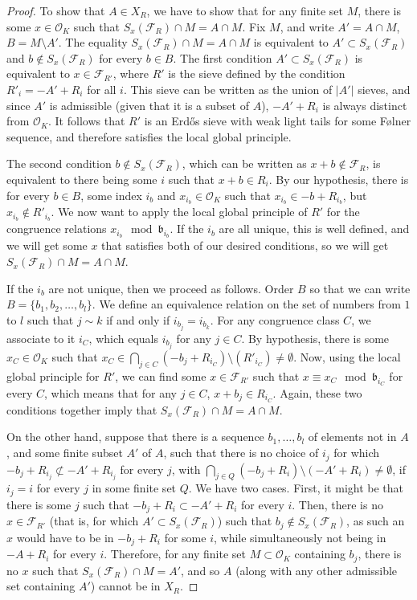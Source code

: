 \documentclass[a4paper,11pt,reqno]{amsart}
\theoremstyle{plain}
\theoremstyle{remark}
\newcommand{\co}{\mathcal{O}}
\newcommand{\fr}{\mathcal{F}_R}
\newcommand{\frp}{\mathcal{F}_{R'}}
\newcommand{\gb}{\mathfrak{b}}
\begin{document}
			\begin{proof}
				To show that $A \in X_R$, we have to show that for any finite set $M$, there is some $x \in \co_K$ such that $S_x(\fr) \cap M = A \cap M$. Fix $M$, and write $A' = A \cap M$, $B = M \setminus A'$. The equality $S_x(\fr) \cap M = A \cap M$ is equivalent to $A' \subset S_x(\fr)$ and $b \not \in S_x(\fr)$ for every $b \in B$. The first condition $A' \subset S_x(\fr)$ is equivalent to $x \in \frp$, where $R'$ is the sieve defined by the condition $R'_i = -A' + R_i$ for all $i$. This sieve can be written as the union of $|A'|$ sieves, and since $A'$ is admissible (given that it is a subset of $A$), $-A' + R_i$ is always distinct from $\co_K$. It follows that $R'$ is an Erdős sieve with weak light tails for some Følner sequence, and therefore satisfies the local global principle. 
				
				The second condition $b \not \in S_x(\fr)$, which can be written as $x+b \not \in \fr$, is equivalent to there being some $i$ such that $x + b  \in R_i$. By our hypothesis, there is for every $b \in B$, some index $i_b$ and $x_{i_b} \in \co_K$ such that $x_{i_b} \in -b + R_{i_b}$, but $x_{i_b} \not \in R'_{i_b}$. We now want to apply the local global principle of $R'$ for the congruence relations $x_{i_b} \mod \gb_{i_b}$. 
				If the $i_b$ are all unique, this is well defined, and we will  get some $x$ that satisfies both of our desired conditions, so we will get $S_x(\fr) \cap M = A \cap M$. 
				
				If the $i_b$ are not unique, then we proceed as follows. Order $B$ so that we can write $B = \{b_1,b_2,\dots,b_l\}$. We define an equivalence relation on the set of numbers from $1$ to $l$ such that $j \sim k$ if and only if $i_{b_j} = i_{b_k}$. For any congruence class $C$, we associate to it $i_C$, which equals $i_{b_j}$ for any $j \in C$. By hypothesis, there is some $x_C \in \co_K$ such that $x_C \in \bigcap_{j \in C} (-b_j + R_{i_C}) \setminus (R'_{i_C}) \neq \emptyset$. Now, using the local global principle for $R'$, we can find some $x \in \frp$ such that $x \equiv x_C \mod \gb_{i_C}$ for every $C$, which means that for any $j \in C$, $x+b_j \in R_{i_C}$. Again, these two conditions together imply that  $S_x(\fr) \cap M = A \cap M$. 
				
				
				On the other hand, suppose that there is a sequence $b_1, \dots, b_l $ of elements not in $A$, and some finite subset $A'$ of $A$, such that there is no choice of $i_j$ for which $-b_j + R_{i_j} \not \subset -A' + R_{i_j}$ for every $j$, with $\bigcap_{j \in Q} (-b_j + R_i) \setminus (-A'+R_i) \neq \emptyset$, if $i_j = i$ for every $j$ in some finite set $Q$. We have two cases. First, it might be that there is some $j$ such that  $-b_j + R_{i} \subset -A' + R_{i}$ for every $i$. Then, there is no $x \in \frp$ (that is, for which $A' \subset S_x(\fr)$) such that $b_j \not \in S_x(\fr)$, as such an $x$ would have to be in $-b_j + R_i$ for some $i$, while simultaneously not being in $-A +R_i$ for every $i$. Therefore, for any finite set $M \subset \co_K$ containing $b_j$, there is no $x$ such that  $S_x(\fr) \cap M = A'$, and so $A$ (along with any other admissible set containing $A'$) cannot be in $X_R$.
				

\end{proof}
\end{document}
